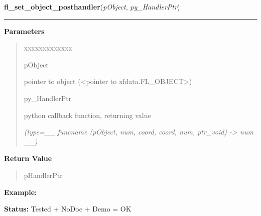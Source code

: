 \hspace{.8\funcindent}\begin{boxedminipage}{\funcwidth}

    \raggedright \textbf{fl\_set\_object\_posthandler}(\textit{pObject}, \textit{py\_HandlerPtr})

    \vspace{-1.5ex}

    \rule{\textwidth}{0.5\fboxrule}
\setlength{\parskip}{2ex}
\setlength{\parskip}{1ex}
      \textbf{Parameters}
      \vspace{-1ex}

      \begin{quote}
        \begin{Ventry}{xxxxxxxxxxxxx}

          \item[pObject]

          pointer to object ({\textless}pointer to 
          xfdata.FL\_OBJECT{\textgreater})

          \item[py\_HandlerPtr]

          python callback function, returning value

            {\it (type=\_\_ funcname (pObject, num, coord, coord, num, ptr\_void) -{\textgreater} 
num \_\_)}

        \end{Ventry}

      \end{quote}

      \textbf{Return Value}
    \vspace{-1ex}

      \begin{quote}
      pHandlerPtr

      \end{quote}

\textbf{Example:} 

\textbf{Status:} Tested + NoDoc + Demo = OK



    \end{boxedminipage}

    \label{xformslib:library:fl_set_object_callback}

    \vspace{0.5ex}

